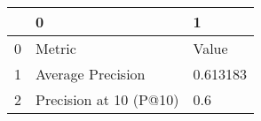 \begin{tabular}{lll}
\toprule
{} &                       0 &         1 \\
\midrule
0 &                  Metric &     Value \\
1 &       Average Precision &  0.613183 \\
2 &  Precision at 10 (P@10) &       0.6 \\
\bottomrule
\end{tabular}
